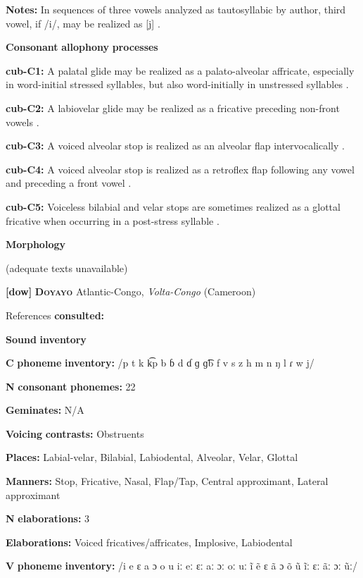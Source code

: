 \textbf{Notes:} In sequences of three vowels analyzed as tautosyllabic by author, third vowel, if /i/, may be realized as [j] \citep[52]{Chacon2012}.

\textbf{Consonant} \textbf{allophony} \textbf{processes}

\textbf{cub-C1:} A palatal glide may be realized as a palato-alveolar affricate, especially in word-initial stressed syllables, but also word-initially in unstressed syllables \citep[67]{Chacon2012}.

\textbf{cub-C2:} A labiovelar glide may be realized as a fricative preceding non-front vowels \citep[63]{Chacon2012}.

\textbf{cub-C3:} A voiced alveolar stop is realized as an alveolar flap intervocalically \citep[63]{Chacon2012}.

\textbf{cub-C4:} A voiced alveolar stop is realized as a retroflex flap following any vowel and preceding a front vowel \citep[6]{Chacon2012}.

\textbf{cub-C5:} Voiceless bilabial and velar stops are sometimes realized as a glottal fricative when occurring in a post-stress syllable \citep[123]{Chacon2012}.

\textbf{Morphology}

(adequate texts unavailable)

\textbf{[dow]}   \textbf{\textsc{Doyayo}}    Atlantic-Congo, \textit{Volta-Congo} (Cameroon)

References \textbf{consulted:} \citet{WieringWiering1994}

\textbf{Sound} \textbf{inventory}

\textbf{C} \textbf{phoneme} \textbf{inventory:} /p t k k͡p b ɓ d ɗ ɡ ɡ͡b f v s z h m n ŋ l ɾ w j/

\textbf{N} \textbf{consonant} \textbf{phonemes:} 22

\textbf{Geminates:} N/A

\textbf{Voicing} \textbf{contrasts:} Obstruents

\textbf{Places:} Labial-velar, Bilabial, Labiodental, Alveolar, Velar, Glottal

\textbf{Manners:} Stop, Fricative, Nasal, Flap/Tap, Central approximant, Lateral approximant

\textbf{N} \textbf{elaborations:} 3

\textbf{Elaborations:} Voiced fricatives/affricates, Implosive, Labiodental

\textbf{V} \textbf{phoneme} \textbf{inventory:} /i e ɛ a ɔ o u iː eː ɛː aː ɔː oː uː ĩ ẽ ɛ ã ɔ õ ũ ĩː ɛː ãː ɔː ũː/

